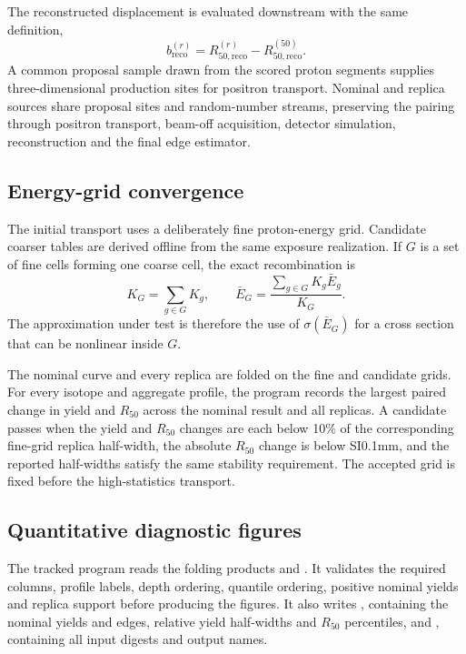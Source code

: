 \documentclass[11pt]{article}
\begin{document}
The reconstructed displacement is evaluated downstream with the same
definition,
\begin{equation}
  b_{\mathrm{reco}}^{(r)}=
  R_{50,\mathrm{reco}}^{(r)}-
  R_{50,\mathrm{reco}}^{(50)}.
\end{equation}
A common proposal sample drawn from the scored proton segments supplies
three-dimensional production sites for positron transport.  Nominal and
replica sources share proposal sites and random-number streams, preserving the
pairing through positron transport, beam-off acquisition, detector simulation,
reconstruction and the final edge estimator.

\subsection{Energy-grid convergence}

The initial transport uses a deliberately fine proton-energy grid.  Candidate
coarser tables are derived offline from the same exposure realization.  If
$G$ is a set of fine cells forming one coarse cell, the exact recombination is
\begin{equation}
  K_G=\sum_{g\in G}K_g,
  \qquad
  \bar E_G=\frac{\sum_{g\in G}K_g\bar E_g}{K_G}.
  \label{eq:coarsening}
\end{equation}
The approximation under test is therefore the use of
$\sigma(\bar E_G)$ for a cross section that can be nonlinear inside $G$.

The nominal curve and every replica are folded on the fine and candidate
grids.  For every isotope and aggregate profile, the program records the
largest paired change in yield and $R_{50}$ across the nominal result and all
replicas.  A candidate passes when the yield and $R_{50}$ changes are each
below 10\% of the corresponding fine-grid replica half-width, the absolute
$R_{50}$ change is below SI{0.1}{mm}, and the reported half-widths satisfy the
same stability requirement.  The accepted grid is fixed before the
high-statistics transport.

\subsection{Quantitative diagnostic figures}

The tracked program
 reads the folding
products and .  It validates the required
columns, profile labels, depth ordering, quantile ordering, positive nominal
yields and replica support before producing the figures.  It also writes
, containing the nominal yields and edges,
relative yield half-widths and $R_{50}$ percentiles, and
, containing all input digests and output names.
\end{document}
